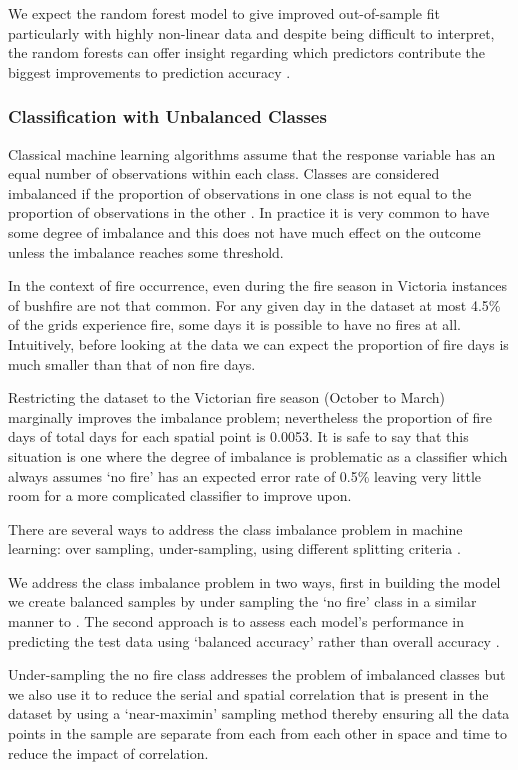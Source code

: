 \documentclass[11pt,a4paper]{article}
\begin{document}
We expect the random forest model to give improved out-of-sample fit particularly with highly non-linear data and despite being difficult to interpret, the random forests can offer insight regarding which predictors contribute the biggest improvements to prediction accuracy \citep{varian14}.


\subsubsection{Classification with Unbalanced Classes}

Classical machine learning algorithms assume that the response variable has an equal number of observations within each class. Classes are considered imbalanced if the proportion of observations in one class is not equal to the proportion of observations in the other \citep{japkowicz00}. In practice it is very common to have some degree of imbalance and this does not have much effect on the outcome unless the imbalance reaches some threshold.

In the context of fire occurrence, even during the fire season in Victoria instances of bushfire are not that common. For any given day in the dataset at most 4.5\% of the grids experience fire, some days it is possible to have no fires at all. Intuitively, before looking at the data we can expect the proportion of fire days is much smaller than that of non fire days.

Restricting the dataset to the Victorian fire season (October to March) marginally improves the imbalance problem; nevertheless the proportion of fire days of total days for each spatial point is 0.0053. It is safe to say that this situation is one where the degree of imbalance is problematic as a classifier which always assumes `no fire' has an expected error rate of 0.5\% leaving very little room for a more complicated classifier to improve upon.

There are several ways to address the class imbalance problem in machine learning: over sampling, under-sampling, using different splitting criteria \citep{japkowicz00}.

We address the class imbalance problem in two ways, first in building the model we create balanced samples by under sampling the `no fire' class in a similar manner to \citep{padilla11}.  The second approach is to assess each model's performance in predicting the test data using `balanced accuracy' rather than overall accuracy \citep{mosley13, japkowicz00}.

Under-sampling the no fire class addresses the problem of imbalanced classes but we also use it to reduce the serial and spatial correlation that is present in the dataset by using a `near-maximin' sampling method thereby ensuring all the data points in the sample are separate from each from each other in space and time to reduce the impact of correlation.
\end{document}
